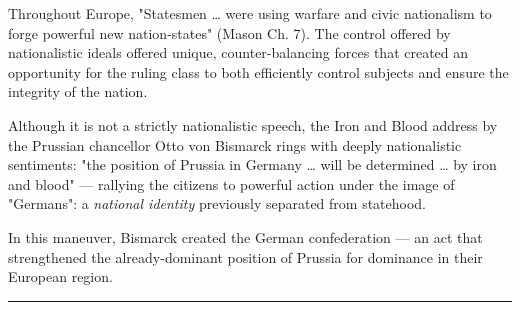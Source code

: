 \documentclass[letterpaper]{article}
\begin{document}
Throughout Europe, "Statesmen \ldots{} were using warfare and civic
nationalism to forge powerful new nation-states" (Mason Ch. 7). The
control offered by nationalistic ideals offered unique,
counter-balancing forces that created an opportunity for the ruling
class to both efficiently control subjects and ensure the integrity of
the nation.

Although it is not a strictly nationalistic speech, the Iron and Blood
address by the Prussian chancellor Otto von Bismarck rings with deeply
nationalistic sentiments: "the position of Prussia in Germany \ldots{} will
be determined \ldots{} by iron and blood" --- rallying the citizens to
powerful action under the image of "Germans": a \emph{national identity}
previously separated from statehood.

In this maneuver, Bismarck created the German confederation --- an act
that strengthened the already-dominant position of Prussia for dominance
in their European region.

\noindent\rule{\textwidth}{0.5pt}
\end{document}
